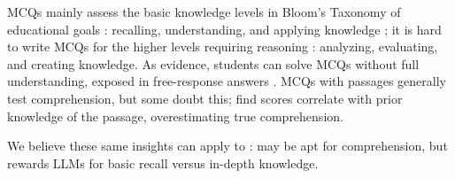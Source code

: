  MCQs mainly assess the basic knowledge levels in Bloom's Taxonomy of educational goals \cite{krathwohl2002revision}: recalling, understanding, and applying knowledge \cite{simkin2005multiple, shin-etal-2024-generation};
it is hard to write MCQs for the higher levels requiring reasoning \cite{stupans2006multiple, palmer2007assessment, lin2012can}: analyzing, evaluating, and creating knowledge.
As evidence, students can solve MCQs without full understanding, exposed in free-response answers \cite{mckenna2019multiple}.
%
MCQs with passages generally test comprehension, but some doubt this;
\citet{ozuru2013comparing} find \mcqa scores correlate with prior knowledge of the passage, overestimating true comprehension.

We believe these same insights can apply to : \mcqa may be apt for
comprehension, but rewards LLMs for basic recall versus in-depth
knowledge.
